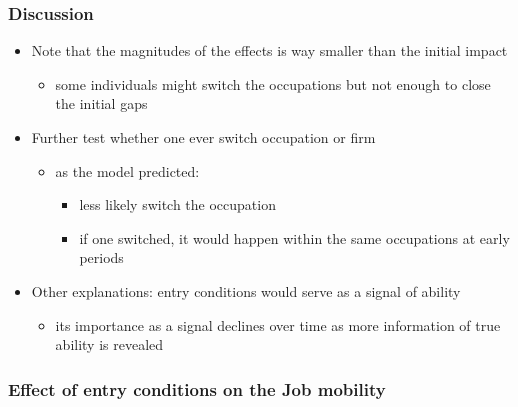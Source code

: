 \documentclass[11pt]{beamer}
\begin{document}
\begin{frame}[label = discussion]
	\frametitle{Discussion}
	\begin{itemize}
		\item Note that the magnitudes of the effects is way smaller than the initial impact
		\begin{itemize}
			\item some individuals might switch the occupations but not enough to close the initial gaps
		\end{itemize}
		\item Further test whether one ever switch occupation or firm   %
		\begin{itemize}
			\item as the model predicted:
			\begin{itemize}
				\item less likely switch the occupation
				\item if one switched, it would happen within the same occupations at early periods
			\end{itemize}
		\end{itemize} 
			\item Other explanations: entry conditions would serve as a signal of ability
			\begin{itemize}
				\item its importance as a signal declines over time as more information of true ability is revealed \hyperlink{signal}{}
			\end{itemize} 
	\end{itemize}
\end{frame}

{
	\begin{frame}[label = mobility]
		\frametitle{Effect of entry conditions on the Job mobility}
		
	\end{frame}
}
\end{document}

